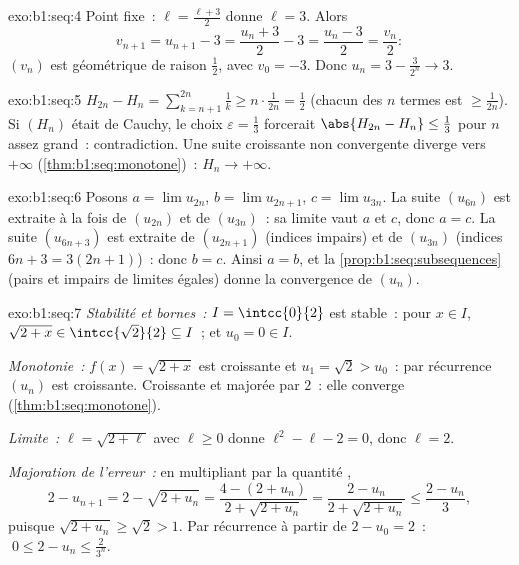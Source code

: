 \begin{solution}{exo:b1:seq:4}
Point fixe~: $\ell = \frac{\ell + 3}{2}$ donne $\ell = 3$. Alors
\[
v_{n+1} = u_{n+1} - 3 = \frac{u_n + 3}{2} - 3 = \frac{u_n - 3}{2} =
\frac{v_n}{2}:
\]
$(v_n)$ est géométrique de raison $\frac12$, avec $v_0 = -3$. Donc
$u_n = 3 - \frac{3}{2^n} \to 3$.
\end{solution}

\begin{solution}{exo:b1:seq:5}
$H_{2n} - H_n = \sum_{k=n+1}^{2n} \frac 1k \geq n \cdot
\frac{1}{2n} = \frac12$ (chacun des $n$ termes est $\geq
\frac{1}{2n}$). Si $(H_n)$ était de Cauchy, le choix $\varepsilon =
\frac13$ forcerait $\abs{H_{2n} - H_n} \leq \frac13$ pour $n$ assez
grand~: contradiction. Une suite croissante non convergente diverge
vers $+\infty$ (\cref{thm:b1:seq:monotone})~: $H_n \to +\infty$.
\end{solution}

\begin{solution}{exo:b1:seq:6}
Posons $a = \lim u_{2n}$, $b = \lim u_{2n+1}$, $c = \lim u_{3n}$. La
suite $(u_{6n})$ est extraite à la fois de $(u_{2n})$ et de
$(u_{3n})$~: sa limite vaut $a$ et $c$, donc $a = c$. La suite
$(u_{6n+3})$ est extraite de $(u_{2n+1})$ (indices impairs) et de
$(u_{3n})$ (indices $6n + 3 = 3(2n+1)$)~: donc $b = c$. Ainsi $a = b$,
et la \cref{prop:b1:seq:subsequences} (pairs et impairs de limites
égales) donne la convergence de $(u_n)$.
\end{solution}

\begin{solution}{exo:b1:seq:7}
\emph{Stabilité et bornes~:} $I = \intcc{0}{2}$ est stable~: pour $x
\in I$, $\sqrt{2 + x} \in \intcc{\sqrt 2}{2} \subseteq I$~; et $u_0 =
0 \in I$.

\emph{Monotonie~:} $f(x) = \sqrt{2+x}$ est croissante et $u_1 =
\sqrt 2 > u_0$~: par récurrence $(u_n)$ est croissante. Croissante et
majorée par $2$~: elle converge
(\cref{thm:b1:seq:monotone}).

\emph{Limite~:} $\ell = \sqrt{2 + \ell}$ avec $\ell \geq 0$ donne
$\ell^2 - \ell - 2 = 0$, donc $\ell = 2$.

\emph{Majoration de l'erreur~:} en multipliant par la quantité
,
\[
2 - u_{n+1} = 2 - \sqrt{2 + u_n}
= \frac{4 - (2 + u_n)}{2 + \sqrt{2+u_n}}
= \frac{2 - u_n}{2 + \sqrt{2 + u_n}}
\leq \frac{2 - u_n}{3},
\]
puisque $\sqrt{2 + u_n} \geq \sqrt 2 > 1$. Par récurrence à partir de
$2 - u_0 = 2$~: $\;0 \leq 2 - u_n \leq \frac{2}{3^n}$.
\end{solution}

